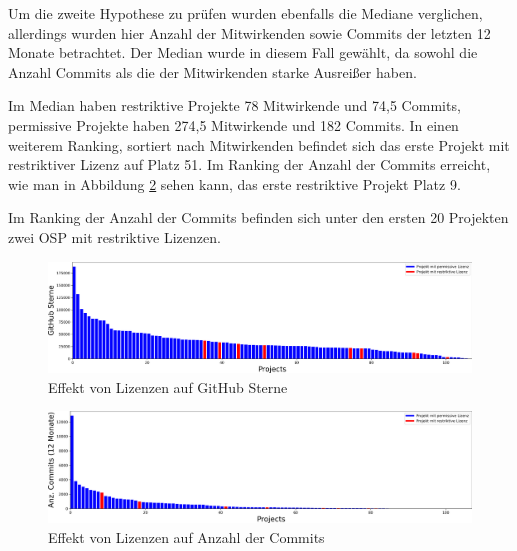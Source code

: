 \bigskip
\noindent
Um die zweite Hypothese zu prüfen wurden ebenfalls die Mediane verglichen, allerdings wurden hier
Anzahl der Mitwirkenden sowie Commits der letzten 12 Monate betrachtet. Der Median wurde in diesem
Fall gewählt, da sowohl die Anzahl Commits als die der Mitwirkenden starke Ausreißer haben.

Im Median haben restriktive Projekte 78 Mitwirkende und 74,5 Commits, permissive Projekte haben 274,5
Mitwirkende und 182 Commits.
In einen weiterem Ranking, sortiert nach Mitwirkenden befindet sich das erste Projekt mit
restriktiver Lizenz auf Platz 51. Im Ranking der Anzahl der Commits erreicht,
wie man in Abbildung \ref{abb:license_vs_commits} sehen kann, das erste restriktive Projekt Platz 9.

Im Ranking der Anzahl der Commits befinden sich unter den ersten 20 Projekten zwei OSP mit restriktive
Lizenzen.




% 

\begin{figure}[]
    \centering
    \includegraphics[scale=0.4]{figures/05/permissive_vs_restrictive_asBarChart.png}
    \caption{Effekt von Lizenzen auf GitHub Sterne}
    \label{abb:permissive_vs_restriktiv_BarChart}
\end{figure}

\begin{figure}[]
    \centering
    \includegraphics[scale=0.4]{figures/05/license_vs_last12MonthsCommits_asBarChart.png}
    \caption{Effekt von Lizenzen auf Anzahl der Commits}
    \label{abb:license_vs_commits}
\end{figure}




